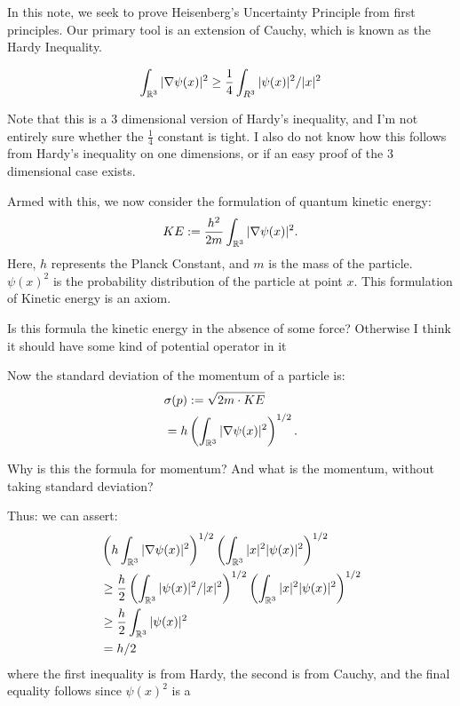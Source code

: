 In this note, we seek to prove Heisenberg's Uncertainty Principle
from first principles. Our primary tool is an extension of
Cauchy, which is known as the Hardy Inequality.

\begin{align}
\int_{\mathbb{R}^3} |\nabla \psi(x)|^2 \geq \frac{1}{4}\int_{R^3} |\psi(x)|^2/|x|^2
\end{align}
\begin{remark} Note that this is a 3 dimensional version of
Hardy's inequality, and I'm not entirely sure whether the
$\frac{1}{4}$ constant is tight. I also do not know how this
follows from Hardy's inequality on one dimensions, or if an easy
proof of the 3 dimensional case exists.
\end{remark}
Armed with this, we now consider the formulation of quantum
kinetic energy:
\begin{align}
KE := \frac{h^2}{2m}\int_{\mathbb{R}^3} |\nabla \psi(x)|^2.
\end{align}
Here, $h$ represents the Planck Constant, and $m$ is the mass of 
the particle. $\psi(x)^2$ is the probability distribution of the
particle at point $x$. This formulation of Kinetic energy is an
axiom.
\begin{remark} Is this formula the kinetic energy in the absence
of some force? Otherwise I think it should have some kind of
potential operator in it
\end{remark}
Now the standard deviation of the momentum of a particle is:
\begin{align}
&\sigma(p) := \sqrt{2 m\cdot KE}
\\
&= h\left(\int_{\mathbb{R}^3} |\nabla \psi(x)|^2\right)^{1/2}.
\end{align}
\begin{remark}
Why is this the formula for momentum? And what is the momentum,
    without taking standard deviation?
\end{remark}
Thus: we can assert:
\begin{align}
& \left(h\int_{\mathbb{R}^3} |\nabla \psi(x)|^2 \right)^{1/2} 
\left(\int_{\mathbb{R}^3} |x|^2 |\psi(x)|^2 \right)^{1/2}
  \\
& \geq \frac{h}{2}\left(\int_{\mathbb{R}^3}
    |\psi(x)|^2/|x|^2\right)^{1/2}
\left(\int_{\mathbb{R}^3} |x|^2 |\psi(x)|^2 \right)^{1/2}
  \\
& \geq \frac{h}{2} \int_{\mathbb{R}^3} |\psi(x)|^2
\\
& = h/2
\end{align}
where the first inequality is from Hardy, the second is from
Cauchy, and the final equality follows since $\psi(x)^2$ is a
